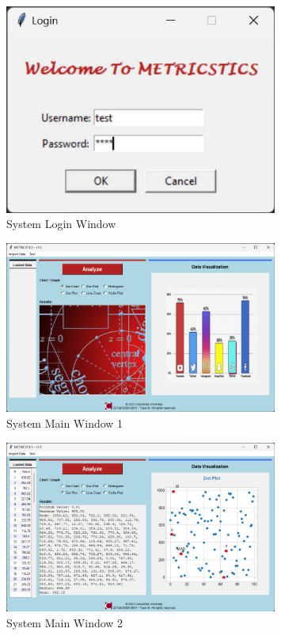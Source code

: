 \documentclass[english,12pt,a4paper]{report}
\begin{document}
	\begin{figure}[H]
		\centering
		\includegraphics[width=0.8\textwidth]{images/login.jpg}
		\caption{System Login Window}
		\label{fig:System Login Window}
	\end{figure}
	
	\begin{figure}[H]
		\centering
		\includegraphics[width=0.8\textwidth]{images/main.jpg}
		\caption{System Main Window 1}
		\label{fig:System Main Window}
	\end{figure}
	
	\begin{figure}[H]
		\centering
		\includegraphics[width=0.8\textwidth]{images/data.jpg}
		\caption{System Main Window 2}
		\label{fig:System Main Window 2}
	\end{figure}
	
\end{document}
